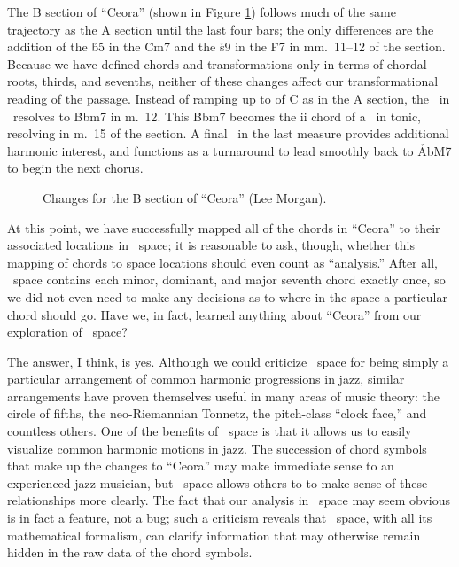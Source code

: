 The B section of ``Ceora'' (shown in Figure \ref{tf:ceora-changes-2}) follows
much of the same trajectory as the A section until the last four bars; the
only differences are the addition of the \h{b5} in the \h{Cm7} and the \h{s9}
in the \h{F7} in mm.~11--12 of the section. Because we have defined chords and
transformations only in terms of chordal roots, thirds, and sevenths, neither
of these changes affect our transformational reading of the passage. Instead
of ramping up to \ii of C as in the A section, the \tf\ in \Bflat\
resolves to \h{Bbm7} in m.~12. This \h{Bbm7} becomes the ii chord of a \tfo\
in tonic, resolving in m.~15 of the section. A final \tf\ in the last measure
provides additional harmonic interest, and functions as a turnaround to lead
smoothly back to \h{AbM7} to begin the next chorus.

\begin{figure}[htbp]
  \caption{Changes for the B section of ``Ceora'' (Lee Morgan).}
  \label{tf:ceora-changes-2}
\end{figure}

At this point, we have successfully mapped all of the chords in ``Ceora'' to
their associated locations in \tf\ space; it is reasonable to ask, though,
whether this mapping of chords to space locations should even count as
``analysis.'' After all, \tf\ space contains each minor, dominant, and major
seventh chord exactly once, so we did not even need to make any decisions as
to where in the space a particular chord should go. Have we, in fact, learned
anything about ``Ceora'' from our exploration of \tf\ space?

The answer, I think, is yes. Although we could criticize \tf\ space for being
simply a particular arrangement of common harmonic progressions in jazz,
similar arrangements have proven themselves useful in many areas of music
theory: the circle of fifths, the neo-Riemannian Tonnetz, the pitch-class
``clock face,'' and countless others.\fn{tf-12} One of the benefits of \tf\
space is that it allows us to easily visualize common harmonic motions in jazz. The
succession of chord symbols that make up the changes to ``Ceora'' may make
immediate sense to an experienced jazz musician, but \tf\ space allows others
to to make sense of these relationships more clearly. The fact that our
analysis in \tf\ space may seem obvious is in fact a feature, not a bug; such
a criticism reveals that \tf\ space, with all its mathematical formalism,
can clarify information that may otherwise remain hidden in the raw data of
the chord symbols.\fn{tf-13}

